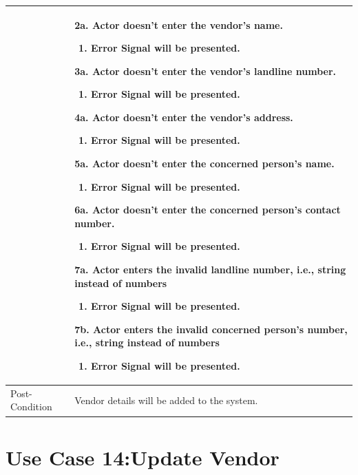 \documentclass[12pt,a4paper]{report}
\begin{document}
\begin{tabular}{ | m{3cm} | m{12cm}| } \hline
& 2a. Actor doesn't enter the vendor's name.
 	\begin{enumerate}
		\item Error Signal will be presented.
	\end{enumerate}

3a. Actor doesn't enter the vendor's landline number.
 	\begin{enumerate}
		\item Error Signal will be presented.
	\end{enumerate}
4a. Actor doesn't enter the vendor's address.
 	\begin{enumerate}
		\item Error Signal will be presented.
	\end{enumerate}

5a. Actor doesn't enter the concerned person's name.
 	\begin{enumerate}
		\item Error Signal will be presented.
	\end{enumerate}
6a. Actor doesn't enter the concerned person's contact number.
 	\begin{enumerate}
		\item Error Signal will be presented.
	\end{enumerate}
7a. Actor enters the invalid landline number, i.e., string instead of numbers
	\begin{enumerate}
		\item Error Signal will be presented.
	\end{enumerate}
7b. Actor enters the invalid concerned person's number, i.e., string instead of numbers
	\begin{enumerate}
		\item Error Signal will be presented.
	\end{enumerate}
\\ \hline
Post-Condition &  Vendor details will be added to the system. \\ \hline

\end{tabular}

\section{Use Case 14:Update Vendor}
\end{document}
